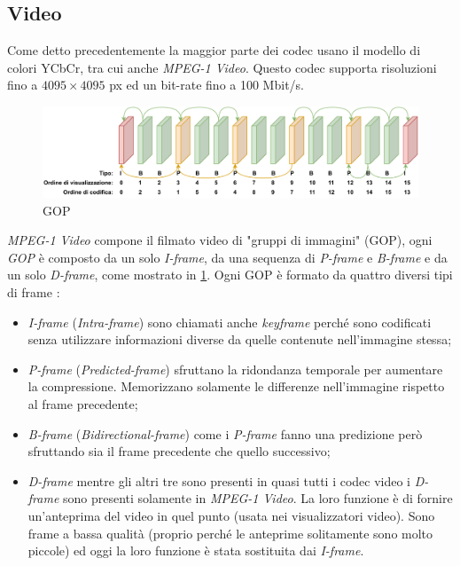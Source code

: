 \subsection{Video}
Come detto precedentemente la maggior parte dei codec usano il modello di colori YCbCr, tra cui anche \textit{MPEG-1 Video}. Questo codec supporta risoluzioni fino a $4095\times4095$ px ed un bit-rate fino a 100 Mbit/s.

\begin{figure}[H]
	\includegraphics[width=\linewidth]{immagini/gop}
	\caption{GOP}
	\label{fig:gop}
\end{figure}

\textit{MPEG-1 Video} compone il filmato video di "gruppi di immagini" (GOP), ogni \textit{GOP} è composto da un solo \textit{I-frame}, da una sequenza di \textit{P-frame} e \textit{B-frame} e da un solo \textit{D-frame}, come mostrato in \ref{fig:gop}. Ogni GOP è formato da quattro diversi tipi di frame \parencite{VideoAndMultimediaTransmissionsOverCellularNetworks}:

\begin{itemize}
    \item \textit{I-frame} (\textit{Intra-frame}) sono chiamati anche \textit{keyframe} perché sono codificati senza utilizzare informazioni diverse da quelle contenute nell'immagine stessa;
    \item \textit{P-frame} (\textit{Predicted-frame}) sfruttano la ridondanza temporale per aumentare la compressione. Memorizzano solamente le differenze nell'immagine rispetto al frame precedente;
    \item \textit{B-frame} (\textit{Bidirectional-frame}) come i \textit{P-frame} fanno una predizione però sfruttando sia il frame precedente che quello successivo;
    \item \textit{D-frame} mentre gli altri tre sono presenti in quasi tutti i codec video i \textit{D-frame} sono presenti solamente in \textit{MPEG-1 Video}. La loro funzione è di fornire un'anteprima del video in quel punto (usata nei visualizzatori video). Sono frame a bassa qualità (proprio perché le anteprime solitamente sono molto piccole) ed oggi la loro funzione è stata sostituita dai \textit{I-frame}.
\end{itemize}

